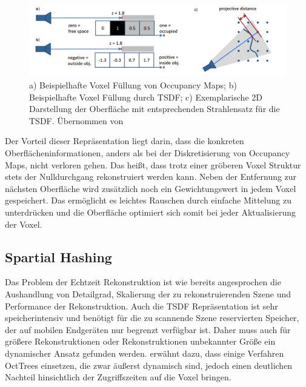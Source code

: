\begin{figure}
  \centering
	\includegraphics[width=1.0\textwidth]{content/images/methods/tsdf.png} 
  \caption{a) Beispielhafte Voxel Füllung von Occupancy Maps; b) Beispielhafte Voxel Füllung durch TSDF; c) Exemplarische 2D Darstellung der Oberfläche mit entsprechenden Strahlensatz für die TSDF. Übernommen von \citet{Compu66:online}}
  \label{fig:tsdf}
\end{figure}

Der Vorteil dieser Repräsentation liegt darin, dass die konkreten Oberflächeninformationen, anders als bei der Diskretisierung von Occupancy Maps, nicht verloren gehen. Das heißt, dass trotz einer gröberen Voxel Struktur stets der Nulldurchgang rekonstruiert werden kann. Neben der Entfernung zur nächsten Oberfläche wird zusätzlich noch ein Gewichtungswert in jedem Voxel gespeichert. Das ermöglicht es leichtes Rauschen durch einfache Mittelung zu unterdrücken und die Oberfläche optimiert sich somit bei jeder Aktualisierung der Voxel. \citep{Compu66:online}\\

\subsection{Spartial Hashing}

Das Problem der Echtzeit Rekonstruktion ist wie bereits angesprochen die Aushandlung von Detailgrad, Skalierung der zu rekonstruierenden Szene und Performance der Rekonstruktion. Auch die TSDF Repräsentation ist sehr speicherintensiv und benötigt für die zu scannende Szene reservierten Speicher, der auf mobilen Endgeräten nur begrenzt verfügbar ist. Daher muss auch für größere Rekonstruktionen oder Rekonstruktionen unbekannter Größe ein dynamischer Ansatz gefunden werden. \citet{Klingensmith_2015_7924} erwähnt dazu, dass einige Verfahren OctTrees einsetzen, die zwar äußerst dynamisch sind, jedoch einen deutlichen Nachteil hinsichtlich der Zugriffszeiten auf die Voxel bringen. \\

